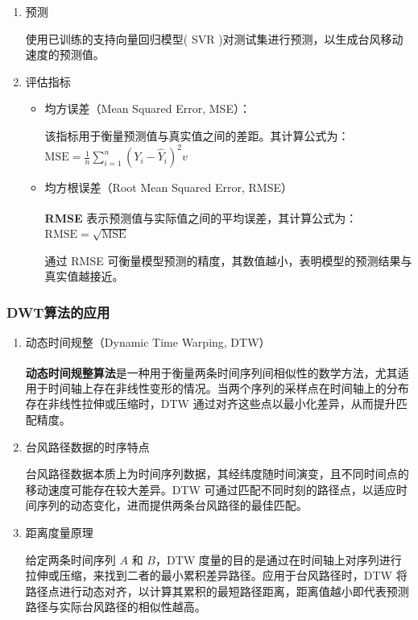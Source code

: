 \documentclass[withoutpreface,bwprint]{cumcmthesis}
\begin{document}
\begin{enumerate}
    \item[(1)]预测

                使用已训练的支持向量回归模型( SVR )对测试集进行预测，以生成台风移动速度的预测值。

    \item[(2)]评估指标

                \begin{itemize}
                    \item 均方误差（Mean Squared Error, MSE）：

                             该指标用于衡量预测值与真实值之间的差距。其计算公式为：$\mathrm{MSE} = \frac{1}{n} \sum_{i=1}^{n} (Y_i - \hat{Y}_i)^2v$

                    \item 均方根误差（Root Mean Squared Error, RMSE）

                            \textbf{RMSE} 表示预测值与实际值之间的平均误差\textsuperscript{\cite{willmott2005advantages}}，其计算公式为：$\mathrm{RMSE} = \sqrt{\mathrm{MSE}}$

                             通过 RMSE 可衡量模型预测的精度，其数值越小，表明模型的预测结果与真实值越接近。
                             
                \end{itemize}
\end{enumerate}




\subsubsection{DWT算法的应用}

\begin{enumerate}
    \item[(1)] 动态时间规整（Dynamic Time Warping, DTW）

                \textbf{动态时间规整算法}\textsuperscript{\cite{muller2007dynamic}}是一种用于衡量两条时间序列间相似性的数学方法，尤其适用于时间轴上存在非线性变形的情况。当两个序列的采样点在时间轴上的分布存在非线性拉伸或压缩时，DTW 通过对齐这些点以最小化差异，从而提升匹配精度。

    \item[(2)]  台风路径数据的时序特点

                台风路径数据本质上为时间序列数据，其经纬度随时间演变，且不同时间点的移动速度可能存在较大差异。DTW 可通过匹配不同时刻的路径点，以适应时间序列的动态变化，进而提供两条台风路径的最佳匹配。

    \item [(3)] 距离度量原理

                给定两条时间序列 $A$ 和 $B$，DTW 度量的目的是通过在时间轴上对序列进行拉伸或压缩，来找到二者的最小累积差异路径。应用于台风路径时，DTW 将路径点进行动态对齐，以计算其累积的最短路径距离，距离值越小即代表预测路径与实际台风路径的相似性越高。
                
\end{enumerate}
\end{document}
